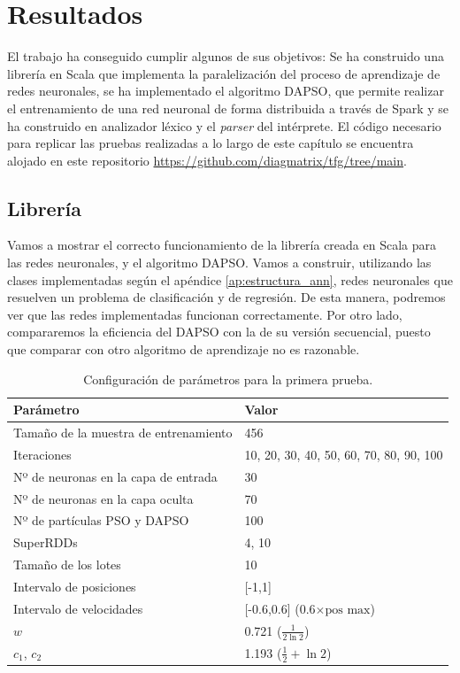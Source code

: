 
\chapter{Resultados}

El trabajo ha conseguido cumplir algunos de sus objetivos: Se ha construido una librería en Scala que implementa la
paralelización del proceso de aprendizaje de redes neuronales, se ha implementado el algoritmo DAPSO, que permite 
realizar el entrenamiento de una red neuronal de forma distribuida a través de Spark y se ha construido en analizador 
léxico y el \textit{parser} del intérprete. El código necesario para replicar las pruebas realizadas a lo largo de este
capítulo se encuentra alojado en este repositorio \url{https://github.com/diagmatrix/tfg/tree/main}.

\section{Librería}

Vamos a mostrar el correcto funcionamiento de la librería creada en Scala para las redes neuronales, y el algoritmo DAPSO.
Vamos a construir, utilizando las clases implementadas según el apéndice \ref{ap:estructura_ann}, redes neuronales que 
resuelven un problema de clasificación y de regresión. De esta manera, podremos ver que las redes implementadas funcionan 
correctamente. Por otro lado, compararemos la eficiencia del DAPSO con la de su versión secuencial, puesto que comparar 
con otro algoritmo de aprendizaje no es razonable. 

\begin{table}[ht!]
    \centering
    \begin{tabular}{x{0.5\textwidth}x{0.3\textwidth}}
    \hline
    \textbf{Parámetro} & \textbf{Valor} \\
    \hline
    Tamaño de la muestra de entrenamiento & 456 \\
    Iteraciones & 10, 20, 30, 40, 50, 60, 70, 80, 90, 100 \\
    Nº de neuronas en la capa de entrada & 30 \\
    Nº de neuronas en la capa oculta & 70 \\
    Nº de partículas PSO y DAPSO & 100 \\
    SuperRDDs & 4, 10 \\
    Tamaño de los lotes & 10 \\
    Intervalo de posiciones & [-1,1] \\
    Intervalo de velocidades & [-0.6,0.6] (0.6$\times\text{pos max}$) \\
    $w$ & 0.721 ($\frac{1}{2\ln{2}}$) \\
    $c_1$, $c_2$ & 1.193 ($\frac 12+\ln{2}$) \\
    \hline
    \end{tabular}
    \caption{Configuración de parámetros para la primera prueba.}
    \label{tab:conf-1}
\end{table}

